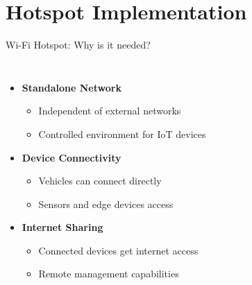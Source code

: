 \documentclass[aspectratio=169]{beamer}
\begin{document}
\section{Hotspot Implementation}

\begin{frame}{Wi-Fi Hotspot: Why is it needed?}
\begin{columns}
\begin{itemize}
    \item \textbf{Standalone Network}
    \begin{itemize}
        \item Independent of external networks
        \item Controlled environment for IoT devices
    \end{itemize}
    \item \textbf{Device Connectivity}
    \begin{itemize}
        \item Vehicles can connect directly
        \item Sensors and edge devices access
    \end{itemize}
    \item \textbf{Internet Sharing}
    \begin{itemize}
        \item Connected devices get internet access
        \item Remote management capabilities
    \end{itemize}
\end{itemize}

\begin{center}
\end{center}
\end{columns}
\end{frame}
\end{document}
